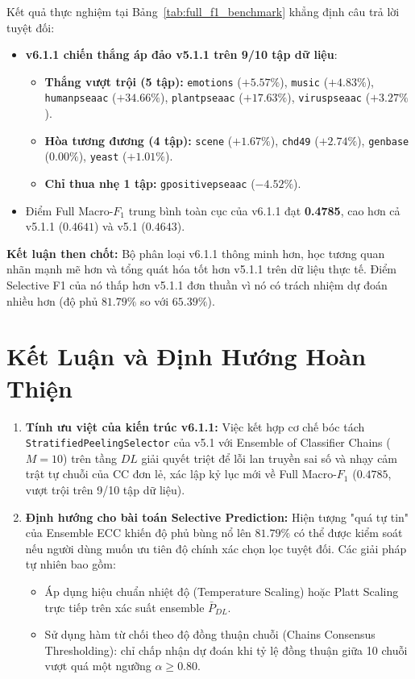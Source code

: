 \documentclass[11pt,a4paper]{article}
\begin{document}
Kết quả thực nghiệm tại Bảng~\ref{tab:full_f1_benchmark} khẳng định câu trả lời tuyệt đối:
\begin{itemize}
    \item \textbf{v6.1.1 chiến thắng áp đảo v5.1.1 trên 9/10 tập dữ liệu}:
    \begin{itemize}
        \item \textbf{Thắng vượt trội (5 tập):} \texttt{emotions} ($+5.57\%$), \texttt{music} ($+4.83\%$), \texttt{humanpseaac} ($+34.66\%$), \texttt{plantpseaac} ($+17.63\%$), \texttt{viruspseaac} ($+3.27\%$).
        \item \textbf{Hòa tương đương (4 tập):} \texttt{scene} ($+1.67\%$), \texttt{chd49} ($+2.74\%$), \texttt{genbase} ($0.00\%$), \texttt{yeast} ($+1.01\%$).
        \item \textbf{Chỉ thua nhẹ 1 tập:} \texttt{gpositivepseaac} ($-4.52\%$).
    \end{itemize}
    \item Điểm Full Macro-$F_1$ trung bình toàn cục của v6.1.1 đạt \textbf{0.4785}, cao hơn cả v5.1.1 ($0.4641$) và v5.1 ($0.4643$).
\end{itemize}

\noindent \textbf{Kết luận then chốt:} Bộ phân loại v6.1.1 thông minh hơn, học tương quan nhãn mạnh mẽ hơn và tổng quát hóa tốt hơn v5.1.1 trên dữ liệu thực tế. Điểm Selective F1 của nó thấp hơn v5.1.1 đơn thuần vì nó có trách nhiệm dự đoán nhiều hơn (độ phủ $81.79\%$ so với $65.39\%$).

\section{Kết Luận và Định Hướng Hoàn Thiện}

\begin{enumerate}
    \item \textbf{Tính ưu việt của kiến trúc v6.1.1:} Việc kết hợp cơ chế bóc tách \texttt{StratifiedPeelingSelector} của v5.1 với Ensemble of Classifier Chains ($M=10$) trên tầng $DL$ giải quyết triệt để lỗi lan truyền sai số và nhạy cảm trật tự chuỗi của CC đơn lẻ, xác lập kỷ lục mới về Full Macro-$F_1$ ($0.4785$, vượt trội trên 9/10 tập dữ liệu).
    \item \textbf{Định hướng cho bài toán Selective Prediction:} Hiện tượng "quá tự tin" của Ensemble ECC khiến độ phủ bùng nổ lên $81.79\%$ có thể được kiểm soát nếu người dùng muốn ưu tiên độ chính xác chọn lọc tuyệt đối. Các giải pháp tự nhiên bao gồm:
    \begin{itemize}
        \item Áp dụng hiệu chuẩn nhiệt độ (Temperature Scaling) hoặc Platt Scaling trực tiếp trên xác suất ensemble $\bar{P}_{DL}$.
        \item Sử dụng hàm từ chối theo độ đồng thuận chuỗi (Chains Consensus Thresholding): chỉ chấp nhận dự đoán khi tỷ lệ đồng thuận giữa 10 chuỗi vượt quá một ngưỡng $\alpha \ge 0.80$.
    \end{itemize}
\end{enumerate}
\end{document}
